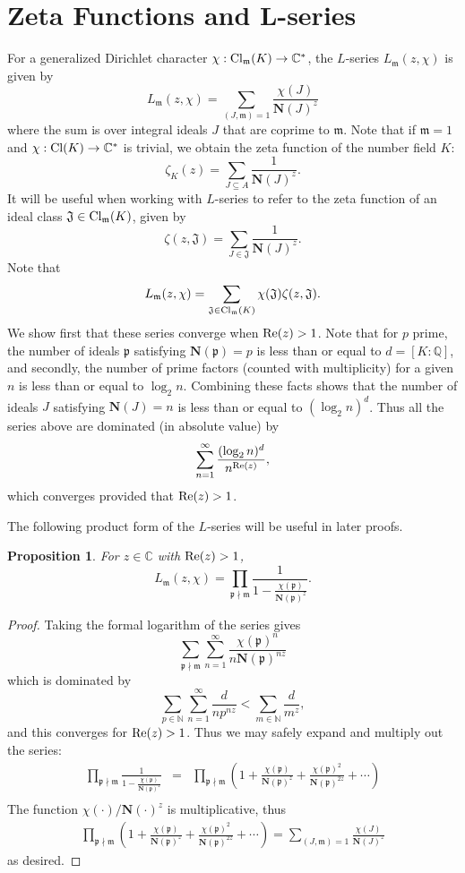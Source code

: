 \documentclass{amsart}
\def\QQ{{\mathbb Q}}
\def\CC{{\mathbb C}}
\def\mf{\mathfrak}
\def\CC{\mathbb{C}}   %
\def\NN{\mathbb{N}}
\def\Cl{\textnormal{Cl}}
\def\bN{\textbf{N}}
\def\Re{\textnormal{Re}}
\newtheorem{proposition}[theorem]{Proposition}
\theoremstyle{definition}
\theoremstyle{remark}
\begin{document}
\section{Zeta Functions and L-series}
\label{defs}

For a generalized Dirichlet character $\chi : \Cl_\mf{m}(K) \to
\CC^*$, the $L$-series $L_\mf{m}(z, \chi)$ is given by
\[
L_\mf{m}(z, \chi) = \sum_{(J, \mf{m}) = 1}
\frac{\chi(J)}{\bN(J)^z}
\]
where the sum is over integral ideals $J$ that are coprime to
$\mf{m}$. Note that if $\mf{m} = 1$ and $\chi: \Cl(K) \to \CC^*$
is trivial, we obtain the zeta function of the number field $K$:
\[
\zeta_K(z) = \sum_{J \subseteq A} \frac{1}{\bN(J)^z}.
\]
It will be useful when working with $L$-series to refer to the
zeta function of an ideal class $\mf{J} \in \Cl_\mf{m} (K)$,
given by
\[
\zeta(z, \mf{J}) = \sum_{J \in \mf{J}} \frac{1}{\bN(J)^z}.
\]
Note that
\[
L_\mf{m}(z, \chi) = \sum_{\mf{J} \in \Cl_\mf{m} (K)} \chi(\mf{J})
\zeta(z, \mf{J}).
\]
We show first that these series converge when $\Re(z)
> 1$. Note that for $p$ prime, the number of ideals $\mf{p}$
satisfying $\bN(\mf{p}) = p$ is less than or equal to $d = [K :
\QQ]$, and secondly, the number of prime factors (counted with
multiplicity) for a given $n$ is less than or equal to $\log_2
n$.  Combining these facts shows that the number of ideals $J$
satisfying $\bN (J) = n$ is less than or equal to $(\log_2 n)^d$.
Thus all the series above are dominated (in absolute value) by
\[
\sum_{n=1}^\infty \frac{(\log_2 n)^d}{n^{\Re(z)}},
\]
which converges provided that $\Re(z) > 1$.

The following product form of the $L$-series will be useful in
later proofs.
\begin{proposition} For $z \in \CC$ with $\Re(z) > 1$,
\[
L_\mf{m} (z, \chi) = \prod_{\mf{p} \nmid \mf{m}} \frac{1}{1 -
\frac{\chi( \mf{p} )}{\bN (\mf{p})^z}}.
\]
\end{proposition}
\begin{proof}
Taking the formal logarithm of the series gives
\[
\sum_{\mf{p} \nmid \mf{m}} \sum_{n=1}^\infty
\frac{\chi(\mf{p})^n}{n \bN(\mf{p})^{nz}}
\]
which is dominated by
\[
\sum_{p \in \NN} \sum_{n=1}^\infty \frac{d}{n p^{nz}} < \sum_{m
\in \NN} \frac{d}{m^z},
\]
and this converges for $\Re(z) > 1$.  Thus we may safely expand
and multiply out the series:
\begin{eqnarray*}
\prod_{\mf{p} \nmid \mf{m}} \frac{1}{1 - \frac{\chi( \mf{p}
)}{\bN (\mf{p})^z}} & = & \prod_{\mf{p} \nmid \mf{m}} \left(1 +
\frac{\chi( \mf{p} )}{\bN (\mf{p})^z} + \frac{\chi( \mf{p}
)^2}{\bN (\mf{p})^{2z}} + \cdots \right) \\
\end{eqnarray*}
The function $\chi( \cdot) / \bN(\cdot)^z$ is multiplicative, thus
\begin{eqnarray*}
\prod_{\mf{p} \nmid \mf{m}} \left(1 + \frac{\chi( \mf{p} )}{\bN
(\mf{p})^z} + \frac{\chi( \mf{p} )^2}{\bN (\mf{p})^{2z}} + \cdots
\right) = \sum_{(J,\mf{m}) = 1} \frac{\chi(J)}{\bN(J)^z}
\end{eqnarray*}
as desired.
\end{proof}
\end{document}

